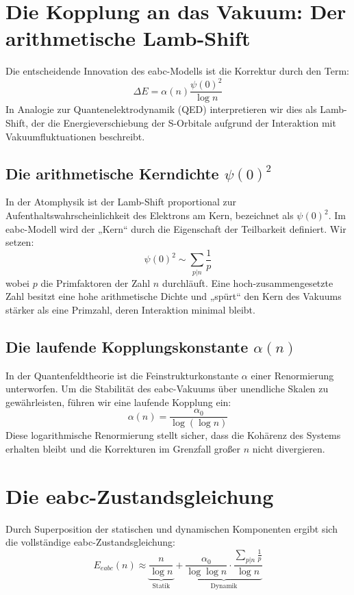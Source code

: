 \documentclass[11pt,a4paper]{article}
\begin{document}
	\section{Die Kopplung an das Vakuum: Der arithmetische Lamb-Shift}
	Die entscheidende Innovation des eabc-Modells ist die Korrektur durch den Term:
	\begin{equation}
		\Delta E = \alpha(n) \frac{\psi(0)^2}{\log n}
	\end{equation}
	In Analogie zur Quantenelektrodynamik (QED) interpretieren wir dies als Lamb-Shift, der die Energieverschiebung der S-Orbitale aufgrund der Interaktion mit Vakuumfluktuationen beschreibt.
	
	\subsection{Die arithmetische Kerndichte $\psi(0)^2$}
	In der Atomphysik ist der Lamb-Shift proportional zur Aufenthaltswahrscheinlichkeit des Elektrons am Kern, bezeichnet als $\psi(0)^2$. Im eabc-Modell wird der „Kern“ durch die Eigenschaft der Teilbarkeit definiert. Wir setzen:
	\begin{equation}
		\psi(0)^2 \sim \sum_{p|n} \frac{1}{p}
	\end{equation}
	wobei $p$ die Primfaktoren der Zahl $n$ durchläuft. Eine hoch-zusammengesetzte Zahl besitzt eine hohe arithmetische Dichte und „spürt“ den Kern des Vakuums stärker als eine Primzahl, deren Interaktion minimal bleibt.
	
	\subsection{Die laufende Kopplungskonstante $\alpha(n)$}
	In der Quantenfeldtheorie ist die Feinstrukturkonstante $\alpha$ einer Renormierung unterworfen. Um die Stabilität des eabc-Vakuums über unendliche Skalen zu gewährleisten, führen wir eine laufende Kopplung ein:
	\begin{equation}
		\alpha(n) = \frac{\alpha_0}{\log(\log n)}
	\end{equation}
	Diese logarithmische Renormierung stellt sicher, dass die Kohärenz des Systems erhalten bleibt und die Korrekturen im Grenzfall großer $n$ nicht divergieren.
	
	\section{Die eabc-Zustandsgleichung}
	Durch Superposition der statischen und dynamischen Komponenten ergibt sich die vollständige eabc-Zustandsgleichung:
	\begin{equation}
		E_{eabc}(n) \approx \underbrace{\frac{n}{\log n}}_{\text{Statik}} + \underbrace{\frac{\alpha_0}{\log \log n} \cdot \frac{\sum_{p|n} \frac{1}{p}}{\log n}}_{\text{Dynamik}}
	\end{equation}
	
\end{document}
